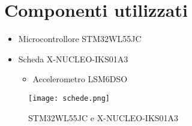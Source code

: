 \section{Componenti utilizzati}
\begin{itemize}
  \item Microcontrollore STM32WL55JC
  \item Scheda X-NUCLEO-IKS01A3
        \begin{itemize}
          \item Accelerometro LSM6DSO
        \end{itemize}
\end{itemize}
\begin{figure}[h!]
  \centering
  \texttt{[image: schede.png]}
  \caption{STM32WL55JC e X-NUCLEO-IKS01A3}
\end{figure}

